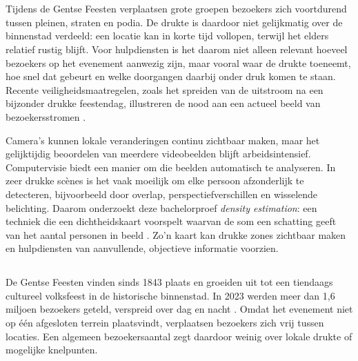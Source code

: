 
\chapter{}%
\label{ch:inleiding}

Tijdens de Gentse Feesten verplaatsen grote groepen bezoekers zich voortdurend tussen pleinen, straten en podia. De drukte is daardoor niet gelijkmatig over de binnenstad verdeeld: een locatie kan in korte tijd vollopen, terwijl het elders relatief rustig blijft. Voor hulpdiensten is het daarom niet alleen relevant hoeveel bezoekers op het evenement aanwezig zijn, maar vooral waar de drukte toeneemt, hoe snel dat gebeurt en welke doorgangen daarbij onder druk komen te staan. Recente veiligheidsmaatregelen, zoals het spreiden van de uitstroom na een bijzonder drukke feestendag, illustreren de nood aan een actueel beeld van bezoekersstromen \autocite{Aneca2024}.

Camera's kunnen lokale veranderingen continu zichtbaar maken, maar het gelijktijdig beoordelen van meerdere videobeelden blijft arbeidsintensief. Computervisie biedt een manier om die beelden automatisch te analyseren. In zeer drukke scènes is het vaak moeilijk om elke persoon afzonderlijk te detecteren, bijvoorbeeld door overlap, perspectiefverschillen en wisselende belichting. Daarom onderzoekt deze bachelorproef \emph{density estimation}: een techniek die een dichtheidskaart voorspelt waarvan de som een schatting geeft van het aantal personen in beeld \autocite{Khan2020}. Zo'n kaart kan drukke zones zichtbaar maken en hulpdiensten van aanvullende, objectieve informatie voorzien.

\section{}%
\label{sec:probleemstelling}

De Gentse Feesten vinden sinds 1843 plaats en groeiden uit tot een tiendaags cultureel volksfeest in de historische binnenstad. In 2023 werden meer dan 1,6 miljoen bezoekers geteld, verspreid over dag en nacht \autocite{StadGentGeschiedenis}. Omdat het evenement niet op één afgesloten terrein plaatsvindt, verplaatsen bezoekers zich vrij tussen locaties. Een algemeen bezoekersaantal zegt daardoor weinig over lokale drukte of mogelijke knelpunten.

